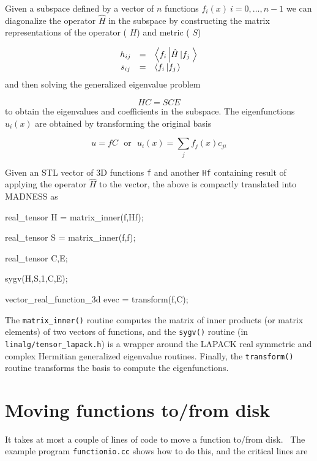 \documentclass[letterpaper]{article}
\begin{document}
Given a subspace defined by a vector of  $n$ functions  $f_{i}(x)\ i=0,\ldots ,n-1$ we can diagonalize the operator 
$\hat{H}$ in the subspace by constructing the matrix representations of the operator ( $H$) and metric ( $S$)

\begin{equation}
\begin{matrix}h_{ij}&\text{=}&\left\langle f_{i}\left|\hat{H}\left|f_{j}\right.\right.\right\rangle
\\s_{ij}&\text{=}&\left\langle f_{i}\left|f_{j}\right.\right\rangle \hfill\null \end{matrix}
\end{equation}
and then solving the generalized eigenvalue problem 

\begin{equation}
HC=SCE
\end{equation}
to obtain the eigenvalues and coefficients in the subspace. The eigenfunctions  $u_{i}(x)$ are obtained by transforming
the original basis 

\begin{equation}
u=fC\ \ \ \mathrm{\text{or}}\ \ \ u_{i}(x)=\sum _{j}f_{j}(x)c_{ji}
\end{equation}

\bigskip

Given an STL vector of 3D functions \texttt{f} and another \texttt{Hf} containing result of applying the operator 
$\hat{H}$ to the vector, the above is compactly translated into MADNESS as

{\ttfamily
real\_tensor H = matrix\_inner(f,Hf);}

{\ttfamily
real\_tensor S = matrix\_inner(f,f);}

{\ttfamily
real\_tensor C,E;}

{\ttfamily
sygv(H,S,1,C,E);}

{\ttfamily
vector\_real\_function\_3d evec = transform(f,C);}

The \texttt{matrix\_inner()} routine computes the matrix of inner products (or matrix elements) of two vectors of
functions, and the \texttt{sygv()} routine (in \texttt{linalg/tensor\_lapack.h}) is a wrapper around the LAPACK real
symmetric and complex Hermitian generalized eigenvalue routines. Finally, the \texttt{transform()} routine transforms
the basis to compute the eigenfunctions.

\section{Moving functions to/from disk}
It takes at most a couple of lines of code to move a function to/from disk. \ The example program \texttt{functionio.cc}
shows how to do this, and the critical lines are
\end{document}
